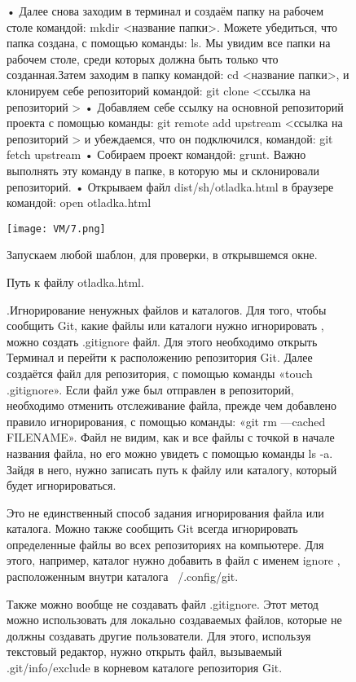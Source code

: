 \begin{figure}
• Далее снова заходим в терминал и создаём папку на рабочем столе командой: mkdir <название папки>. Можете убедиться, что папка создана, с помощью команды: ls. Мы увидим все папки на рабочем столе, среди которых должна быть только что созданная.Затем заходим в папку командой: cd <название папки>, и клонируем себе репозиторий командой: git clone <ссылка на репозиторий >
  \newline   • Добавляем себе ссылку на основной репозиторий проекта с помощью команды: git remote add upstream <ссылка на репозиторий > и убеждаемся, что он подключился, командой: git fetch upstream 
   \newline  • Собираем проект командой: grunt. Важно выполнять эту команду в папке, в которую мы и склонировали репозиторий.
  \newline  • Открываем файл dist/sh/otladka.html в браузере командой: open otladka.html


		\texttt{[image: VM/7.png]}
\caption{Путь к файлу otladka.html.}
\label{ris:image}
\quad Запускаем любой шаблон, для проверки, в открывшемся окне.
\end{figure}

\begin{figure}
.\quad  Игнорирование ненужных файлов и каталогов.
\newline \quad Для того, чтобы сообщить Git, какие файлы или каталоги нужно игнорировать , можно создать .gitignore файл.
\newline Для этого необходимо открыть Терминал и перейти к расположению репозитория Git. Далее создаётся файл для репозитория, с помощью команды «touch .gitignore».
\newline Если файл уже был отправлен в репозиторий, необходимо отменить отслеживание файла, прежде чем добавлено правило игнорирования, с помощью команды: «git rm —cached FILENAME».
\newline Файл не видим, как и все файлы с точкой в начале названия файла, но его можно увидеть с помощью команды ls -a. Зайдя в него, нужно записать путь к файлу или каталогу, который будет игнорироваться.
\end{figure}

\begin{figure}
\quad Это не единственный способ задания игнорирования файла или каталога.
\newline Можно также сообщить Git всегда игнорировать определенные файлы во всех репозиториях на компьютере. Для этого, например, каталог нужно добавить в файл с именем ignore , расположенным внутри каталога ~/.config/git.
\end{figure}

\begin{figure}
\quad Также можно вообще не создавать файл .gitignore. 
\newline Этот метод можно использовать для локально создаваемых файлов, которые не должны создавать другие пользователи. Для этого, используя текстовый редактор, нужно открыть файл, вызываемый .git/info/exclude в корневом каталоге репозитория Git.
\end{figure}